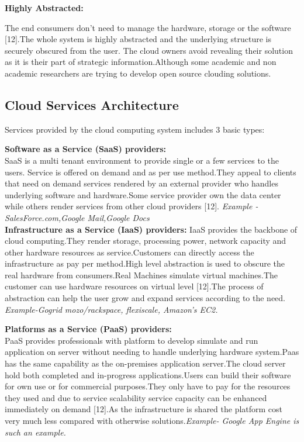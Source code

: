 \documentclass {report}
\begin{document}
{\bfseries Highly Abstracted:}

The end consumers don't need to manage the hardware, storage or the software [12].The 
whole system is highly abstracted and the underlying structure is securely obscured from the user.
The cloud owners avoid revealing their solution as it is their part of strategic
information.Although some academic and non academic researchers are trying to develop 
open source clouding solutions.\\

\subsection{Cloud Services Architecture}

Services provided by the cloud computing system includes 3 basic types:

{\bfseries Software as a Service (SaaS) providers:\\}
SaaS is a multi tenant environment to provide single or a few services to the users.
Service is offered on demand and as per use method.They appeal to clients that need 
on demand services rendered by an external provider who handles underlying software
and hardware.Some service provider own the data center while others render services
from other cloud providers [12].\emph{ Example - SalesForce.com,Google Mail,Google Docs}\\

{\bfseries Infrastructure as a Service (IaaS) providers:}
IaaS provides the backbone of cloud computing.They render storage, processing power,
network capacity and other hardware resources as service.Customers can directly access
the infrastructure as pay per method.High level abstraction is used to obscure the real 
hardware from consumers.Real Machines simulate virtual machines.The customer can use
hardware resources on virtual level [12].The process of abstraction can help the user grow and
expand services according to the need.\emph{ Example-Gogrid mozo/rackspace, flexiscale, Amazon's EC2.\\}

{\bfseries Platforms as a Service (PaaS) providers:\\}
PaaS provides professionals with platform to develop simulate and run application on server
without needing to handle underlying hardware system.Paas has the same capability as
the on-premises application server.The cloud server hold both completed and in-progress
applications.Users can build their software for own use or for commercial purposes.They
only have to pay for the resources they used and due to service scalability service capacity 
can be enhanced immediately on demand [12].As the infrastructure is shared the platform cost
very much less compared with otherwise solutions.\emph{Example- Google App Engine is such an example.\\}
\end{document}
